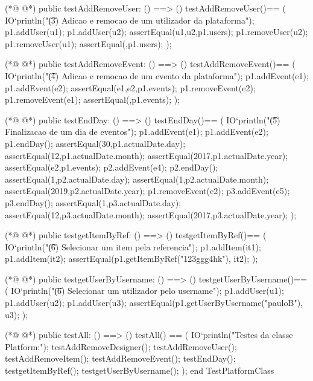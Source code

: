 \begin{vdmpp}[breaklines=true]
(*@
\label{testAddRemoveUser:78}
@*)
 public testAddRemoveUser: () ==> ()
 testAddRemoveUser()==
 (
  IO`println("\t (3) Adicao e remocao de um utilizador da plataforma");
  p1.addUser(u1);
  p1.addUser(u2);
  assertEqual({u1,u2},p1.users);
  p1.removeUser(u2);
  p1.removeUser(u1);
  assertEqual({},p1.users);
 );
 
(*@
\label{testAddRemoveEvent:90}
@*)
 public testAddRemoveEvent: () ==> ()
 testAddRemoveEvent()==
 (
  IO`println("\t (4) Adicao e remocao de um evento da plataforma");
  p1.addEvent(e1);
  p1.addEvent(e2);
  assertEqual({e1,e2},p1.events);
  p1.removeEvent(e2);
  p1.removeEvent(e1);
  assertEqual({},p1.events);
 );
 
 
(*@
\label{testEndDay:103}
@*)
 public testEndDay: () ==> ()
 testEndDay()==
 ( IO`println("\t (5) Finalizacao de um dia de eventos");
  p1.addEvent(e1);
  p1.addEvent(e2);
  p1.endDay();
  assertEqual(30,p1.actualDate.day);
  assertEqual(12,p1.actualDate.month);
  assertEqual(2017,p1.actualDate.year);
  assertEqual({e2},p1.events);
  p2.addEvent(e4);
  p2.endDay();
  assertEqual(1,p2.actualDate.day);
  assertEqual(1,p2.actualDate.month);
  assertEqual(2019,p2.actualDate.year);
  p1.removeEvent(e2);
  p3.addEvent(e5);
  p3.endDay();
  assertEqual(1,p3.actualDate.day);
  assertEqual(12,p3.actualDate.month);
  assertEqual(2017,p3.actualDate.year);
 );
 
(*@
\label{testgetItemByRef:126}
@*)
 public testgetItemByRef: () ==> ()
 testgetItemByRef()==
 (
  IO`println("\t (6) Selecionar um item pela referencia");
  p1.addItem(it1);
  p1.addItem(it2);
  assertEqual(p1.getItemByRef("123ggg4hk"), it2);
 );
 
(*@
\label{testgetUserByUsername:135}
@*)
 public testgetUserByUsername: () ==> ()
  testgetUserByUsername()==
  (
   IO`println("\t (6) Selecionar um utilizador pelo username");
   p1.addUser(u1);
   p1.addUser(u2);
   p1.addUser(u3);
   assertEqual(p1.getUserByUsername("pauloB"), u3);
  );
 
(*@
\label{testAll:145}
@*)
 public testAll: () ==> ()
  testAll() == (
  IO`println("Testes da classe Platform:");
   testAddRemoveDesigner();
   testAddRemoveUser();
   testAddRemoveItem();
   testAddRemoveEvent();
   testEndDay();
   testgetItemByRef();
   testgetUserByUsername();
  );
end TestPlatformClass
\end{vdmpp}


